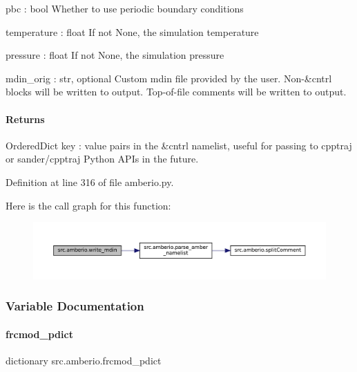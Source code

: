 pbc \+: bool Whether to use periodic boundary conditions

temperature \+: float If not None, the simulation temperature

pressure \+: float If not None, the simulation pressure

mdin\+\_\+orig \+: str, optional Custom mdin file provided by the user. Non-\/\&cntrl blocks will be written to output. Top-\/of-\/file comments will be written to output.

\paragraph*{Returns }

Ordered\+Dict key \+: value pairs in the \&cntrl namelist, useful for passing to cpptraj or sander/cpptraj Python A\+P\+Is in the future. 

Definition at line 316 of file amberio.\+py.

Here is the call graph for this function\+:
\nopagebreak
\begin{figure}[H]
\begin{center}
\leavevmode
\includegraphics[width=350pt]{namespacesrc_1_1amberio_aa3b1df1e806f3b06b41bcaabe3873998_cgraph}
\end{center}
\end{figure}


\subsubsection{Variable Documentation}
\mbox{\label{namespacesrc_1_1amberio_a5c0a9d5f44c2ea9fdd2f3ebecd2f0e1e}} 
\paragraph{\texorpdfstring{frcmod\+\_\+pdict}{frcmod\_pdict}}
{\footnotesize\ttfamily dictionary src.\+amberio.\+frcmod\+\_\+pdict}

